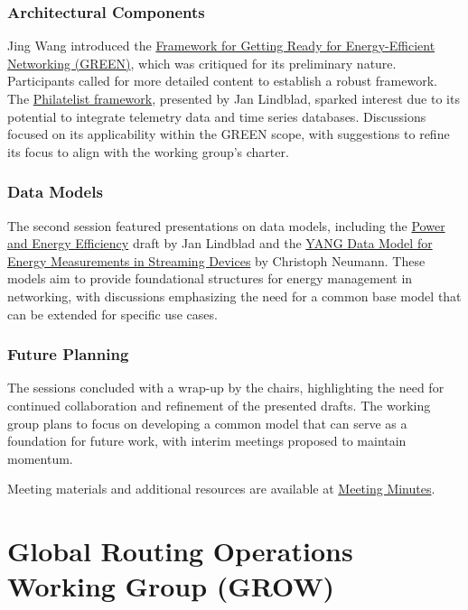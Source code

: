 \documentclass{article}
\begin{document}
\subsubsection{Architectural Components}
Jing Wang introduced the \href{https://datatracker.ietf.org/doc/draft-wang-green-framework/}{Framework for Getting Ready for Energy-Efficient Networking (GREEN)}, which was critiqued for its preliminary nature. Participants called for more detailed content to establish a robust framework. The \href{https://datatracker.ietf.org/doc/draft-lindblad-tlm-philatelist/}{Philatelist framework}, presented by Jan Lindblad, sparked interest due to its potential to integrate telemetry data and time series databases. Discussions focused on its applicability within the GREEN scope, with suggestions to refine its focus to align with the working group's charter.

\subsubsection{Data Models}
The second session featured presentations on data models, including the \href{https://datatracker.ietf.org/doc/draft-opsawg-poweff/}{Power and Energy Efficiency} draft by Jan Lindblad and the \href{https://datatracker.ietf.org/doc/draft-neumann-green-streaming-yang/}{YANG Data Model for Energy Measurements in Streaming Devices} by Christoph Neumann. These models aim to provide foundational structures for energy management in networking, with discussions emphasizing the need for a common base model that can be extended for specific use cases.

\subsubsection{Future Planning}
The sessions concluded with a wrap-up by the chairs, highlighting the need for continued collaboration and refinement of the presented drafts. The working group plans to focus on developing a common model that can serve as a foundation for future work, with interim meetings proposed to maintain momentum.

Meeting materials and additional resources are available at \href{https://notes.ietf.org/notes-ietf-122-green}{Meeting Minutes}.




\newpage

\section{Global Routing Operations Working Group (GROW)}
\end{document}
